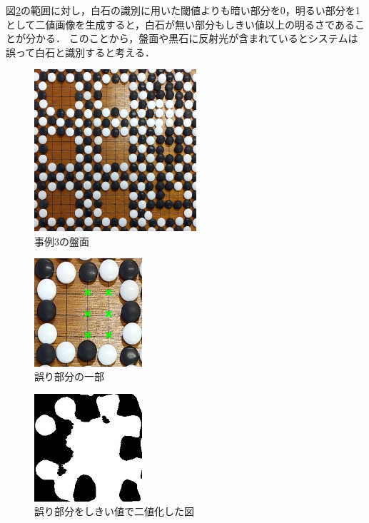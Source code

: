 \documentclass[openright]{nitocs}
\numberwithin{equation}{section}
\begin{document}
                図\ref{ex3_error}の範囲に対し，白石の識別に用いた閾値よりも暗い部分を0，明るい部分を1として二値画像を生成すると，白石が無い部分もしきい値以上の明るさであることが分かる．
                このことから，盤面や黒石に反射光が含まれているとシステムは誤って白石と識別すると考える．
                \begin{figure}[tb] %
                    \begin{center}
                    \includegraphics[clip,width=60mm]{DSC_0098/boardImg.jpg} 
                    \caption{事例3の盤面}
                    \label{ex3}
                    \end{center}
                \end{figure}

                \begin{figure}[tb] %
                    \begin{center}
                    \includegraphics[clip,width=40mm]{DSC_0098/TRIM_resultCompare.jpg} 
                    \caption{誤り部分の一部}
                    \label{ex3_error}
                    \end{center}
                \end{figure}

                \begin{figure}[tb] %
                    \begin{center}
                    \includegraphics[clip,width=40mm]{DSC_0098/TRIM_inRange_WHITE.jpg} 
                    \caption{誤り部分をしきい値で二値化した図}
                    \label{ex3_error_area}
                    \end{center}
                \end{figure}
\end{document}
